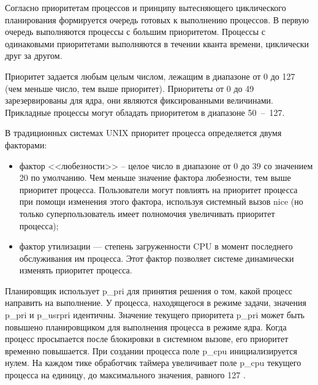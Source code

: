 \documentclass[a4paper,oneside,14pt]{extarticle}
\begin{document}
Согласно приоритетам процессов и принципу вытесняющего циклического планирования формируется очередь готовых к выполнению процессов.
В первую очередь выполняются процессы с большим приоритетом.
Процессы с одинаковыми приоритетами выполняются в течении кванта времени, циклически друг за другом.

Приоритет задается любым целым числом, лежащим в диапазоне от 0 до 127 (чем меньше число, тем выше приоритет).
Приоритеты от 0 до 49 зарезервированы для ядра, они являются фиксированными величинами.
Прикладные процессы могут обладать приоритетом в диапазоне 50~--~127.

В традиционных системах UNIX приоритет процесса определяется двумя факторами: 
\begin{itemize}
	\item фактор <<любезности>> – целое число в диапазоне от 0 до 39 со значением 20 по умолчанию. Чем меньше значение фактора любезности, тем выше приоритет процесса. Пользователи могут повлиять на приоритет процесса при помощи изменения этого фактора, используя системный вызов nice (но только суперпользователь имеет полномочия увеличивать приоритет процесса);
	\item фактор утилизации --- степень загруженности CPU в момент последнего обслуживания им процесса. Этот фактор позволяет системе динамически изменять приоритет процесса.
\end{itemize}

Планировщик использует p\_pri для принятия решения о том, какой процесс направить на выполнение.
У процесса, находящегося в режиме задачи, значения p\_pri и p\_usrpri идентичны.
Значение текущего приоритета p\_pri может быть повышено планировщиком для выполнения процесса в режиме ядра.
Когда процесс просыпается после блокировки в системном вызове, его приоритет временно повышается.
При создании процесса поле p\_cpu инициализируется нулем.
На каждом тике обработчик таймера увеличивает поле p\_cpu текущего процесса на единицу, до максимального значения, равного 127 \cite[c.~194]{unix}.
\end{document}
